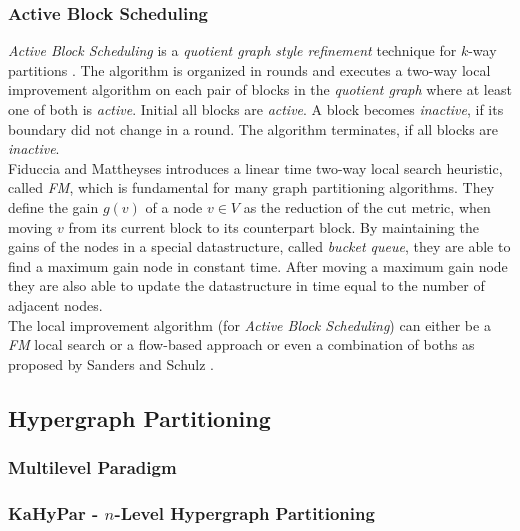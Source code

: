 \subsubsection{Active Block Scheduling}
\label{sec:abs}
\emph{Active Block Scheduling} is a \emph{quotient graph style refinement} technique for
$k$-way partitions \cite{holtgrewe2010engineering,sanders2011engineering}. 
The algorithm is organized in rounds and executes a two-way 
local improvement algorithm on each pair of 
blocks in the \emph{quotient graph} where at least one of both is \emph{active}. 
Initial all blocks are \emph{active}. A block becomes \emph{inactive}, 
if its boundary did not change in a round. The algorithm
terminates, if all blocks are \emph{inactive}. \\
Fiduccia and Mattheyses \cite{fiduccia1988linear} introduces a linear time
two-way local search heuristic, called \emph{FM}, 
which is fundamental for many graph partitioning algorithms.
They define the gain $g(v)$ of a node $v \in V$ as the reduction of the cut metric, when
moving $v$ from its current block to its counterpart block. By maintaining the gains of the
nodes in a special datastructure, called \emph{bucket queue}, they are able to find a maximum
gain node in constant time. After moving a maximum gain node they are also able to update the
datastructure in time equal to the number of adjacent nodes.\\
The local improvement algorithm (for \emph{Active Block Scheduling}) can either 
be a \emph{FM} local search or a flow-based approach or even a combination of 
boths as proposed by Sanders and Schulz \cite{sanders2011engineering}. \\



\subsection{Hypergraph Partitioning}

\subsubsection{Multilevel Paradigm}

\subsubsection{KaHyPar - $n$-Level Hypergraph Partitioning}
\label{sec:kahypar}